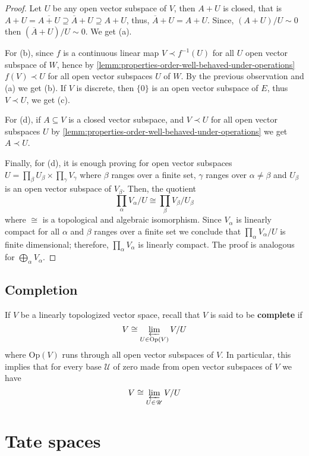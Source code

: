 \begin{proof}
	Let $U$ be any open vector subspace of $V$, then $A + U$ is closed, that is $A + U = \overline{A + U} \supseteq \overline{A} + U \supseteq A + U$, thus, $\overline{A} + U = A + U$. Since, $(A + U)/U \sim 0$ then $(\overline{A} + U)/U \sim 0$. We get (a). 

	For (b), since $f$ is a continuous linear map $V \prec f^{-1}(U)$ for all $U$ open vector subspace of $W$, hence by \cref{lemm:properties-order-well-behaved-under-operations} $f(V) \prec U$ for all open vector subspaces $U$ of $W$. By the previous observation and (a) we get (b). If $V$ is discrete, then $\{0\}$ is an open vector subspace of $E$, thus $V \prec U$, we get (c). 

	For (d), if $A \subseteq V$ is a closed vector subspace, and $V \prec U$ for all open vector subspaces $U$ by \cref{lemm:properties-order-well-behaved-under-operations} we get $A \prec U$. 

	Finally, for (d), it is enough proving for open vector subspaces $U = \prod_{\beta} U_{\beta} \times \prod_{\gamma} V_{\gamma}$ where $\beta$ ranges over a finite set, $\gamma$ ranges over $\alpha \neq \beta$ and $U_{\beta}$ is an open vector subspace of $V_{\beta}$. Then, the quotient
	\[
		\prod_{\alpha}V_{\alpha} / U \cong \prod_{\beta} V_{\beta}/U_{\beta}
	\]
	where $\cong$ is a topological and algebraic isomorphism. Since $V_{\alpha}$ is linearly compact for all $\alpha$ and $\beta$ ranges over a finite set we conclude that $\prod_{\alpha} V_{\alpha} / U$ is finite dimensional; therefore, $\prod_{\alpha} V_{\alpha}$ is linearly compact. The proof is analogous for $\bigoplus_{\alpha} V_{\alpha}$.
\end{proof} 
\subsection*{Completion}
\begin{definition}\label{def:completion}
	If $V$ be a linearly topologized vector space, recall that $V$ is said to be \textbf{complete} if 
	\[
		V \cong \varprojlim_{U \in \operatorname{Op}(V)} V/U
	\]
	where $\text{Op}(V)$ runs through all open vector subspaces of $V$. In particular, this implies that for every base $\mathscr{U}$ of zero made from open vector subspaces of $V$ we have
	\[
		V \cong \varprojlim_{U \in \mathscr{U}} V/U
	\]
\end{definition}

\section{Tate spaces}
